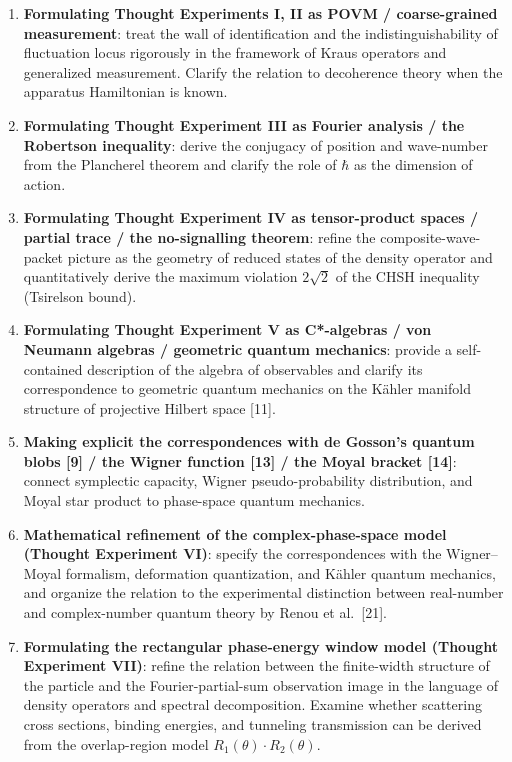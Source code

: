 \documentclass[
]{article}
\providecommand{\tightlist}{%
  \setlength{\itemsep}{0pt}\setlength{\parskip}{0pt}}
\begin{document}
\begin{enumerate}
\def\labelenumi{\arabic{enumi}.}
\tightlist
\item
  \textbf{Formulating Thought Experiments I, II as POVM / coarse-grained
  measurement}: treat the wall of identification and the
  indistinguishability of fluctuation locus rigorously in the framework
  of Kraus operators and generalized measurement. Clarify the relation
  to decoherence theory when the apparatus Hamiltonian is known.
\item
  \textbf{Formulating Thought Experiment III as Fourier analysis / the
  Robertson inequality}: derive the conjugacy of position and
  wave-number from the Plancherel theorem and clarify the role of
  \(\hbar\) as the dimension of action.
\item
  \textbf{Formulating Thought Experiment IV as tensor-product spaces /
  partial trace / the no-signalling theorem}: refine the
  composite-wave-packet picture as the geometry of reduced states of the
  density operator and quantitatively derive the maximum violation
  \(2\sqrt{2}\) of the CHSH inequality (Tsirelson bound).
\item
  \textbf{Formulating Thought Experiment V as C*-algebras / von Neumann
  algebras / geometric quantum mechanics}: provide a self-contained
  description of the algebra of observables and clarify its
  correspondence to geometric quantum mechanics on the Kähler manifold
  structure of projective Hilbert space {[}11{]}.
\item
  \textbf{Making explicit the correspondences with de Gosson's quantum
  blobs {[}9{]} / the Wigner function {[}13{]} / the Moyal bracket
  {[}14{]}}: connect symplectic capacity, Wigner pseudo-probability
  distribution, and Moyal star product to phase-space quantum mechanics.
\item
  \textbf{Mathematical refinement of the complex-phase-space model
  (Thought Experiment VI)}: specify the correspondences with the
  Wigner--Moyal formalism, deformation quantization, and Kähler quantum
  mechanics, and organize the relation to the experimental distinction
  between real-number and complex-number quantum theory by Renou et
  al.~{[}21{]}.
\item
  \textbf{Formulating the rectangular phase-energy window model (Thought
  Experiment VII)}: refine the relation between the finite-width
  structure of the particle and the Fourier-partial-sum observation
  image in the language of density operators and spectral decomposition.
  Examine whether scattering cross sections, binding energies, and
  tunneling transmission can be derived from the overlap-region model
  \(R_1(\theta) \cdot R_2(\theta)\).
\end{enumerate}
\end{document}
